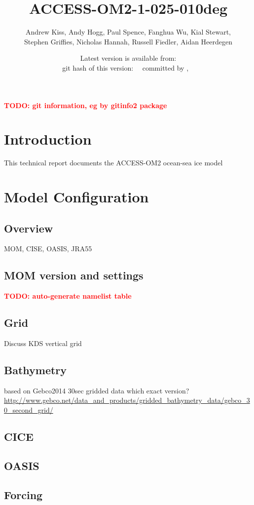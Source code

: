 \documentclass[11pt]{article}
\title{ACCESS-OM2-1-025-010deg}
\author{Andrew Kiss, Andy Hogg, Paul Spence, Fanghua Wu, Kial Stewart,\\ Stephen Griffies, Nicholas Hannah, Russell Fiedler, Aidan Heerdegen}
\date{\textsf{Latest version is available from:\\
{\footnotesize git hash of this version: \gitAbbrevHash\ \gitDirty\ committed by \gitCommitterName , \gitCommitterIsoDate\ } }}                                        %
\newcommand{\TODO}[1]{\textcolor{red}{\textbf{TODO: #1}}}
\begin{document}
\maketitle
\TODO{git information, eg by gitinfo2 package}

\section{Introduction}
This technical report documents the ACCESS-OM2 ocean-sea ice model

\section{Model Configuration}

\subsection{Overview}
MOM, CISE, OASIS, JRA55

\subsection{MOM version and settings}
\TODO{auto-generate namelist table}

\subsection{Grid}

Discuss KDS vertical grid

\subsection{Bathymetry}
based on Gebco2014 30sec gridded data %
which exact version? \url{http://www.gebco.net/data_and_products/gridded_bathymetry_data/gebco_30_second_grid/}

\subsection{CICE}

\subsection{OASIS}

\subsection{Forcing}
\end{document}
